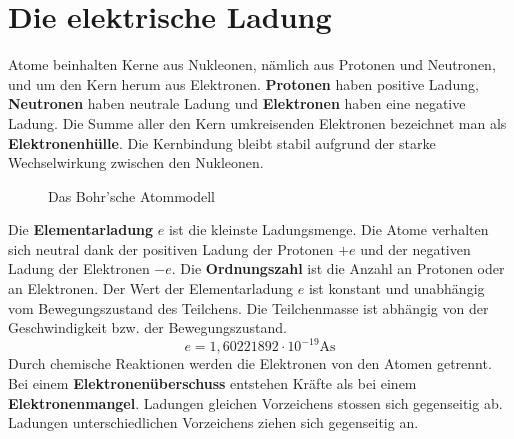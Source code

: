 \section{Die elektrische Ladung}
Atome beinhalten Kerne aus Nukleonen, nämlich aus Protonen und Neutronen, und um den Kern herum aus Elektronen. \textbf{Protonen} haben positive Ladung, \textbf{Neutronen} haben neutrale Ladung und \textbf{Elektronen} haben eine negative Ladung. Die Summe aller den Kern umkreisenden Elektronen bezeichnet man als \textbf{Elektronenhülle}. Die Kernbindung bleibt stabil aufgrund der starke Wechselwirkung zwischen den Nukleonen.
\begin{figure}[H]
\centering
{}
\caption{Das Bohr'sche Atommodell}
\label{fig_Ia}
\end{figure}
\noindent Die \textbf{Elementarladung} $e$ ist die kleinste Ladungsmenge. Die Atome verhalten sich neutral dank der positiven Ladung der Protonen $+e$ und der negativen Ladung der Elektronen $-e$. Die \textbf{Ordnungszahl} ist die Anzahl an Protonen oder an Elektronen. Der Wert der Elementarladung $e$ ist konstant und unabhängig vom Bewegungszustand des Teilchens. Die Teilchenmasse ist abhängig von der Geschwindigkeit bzw. der Bewegungszustand.
\begin{equation}
\boxed{e=1,60221892\cdot 10^{-19}\text{As}}
\end{equation}
Durch chemische Reaktionen werden die Elektronen von den Atomen getrennt. Bei einem \textbf{Elektronenüberschuss} entstehen Kräfte als bei einem \textbf{Elektronenmangel}. Ladungen gleichen Vorzeichens stossen sich gegenseitig ab. Ladungen unterschiedlichen Vorzeichens ziehen sich gegenseitig an.
